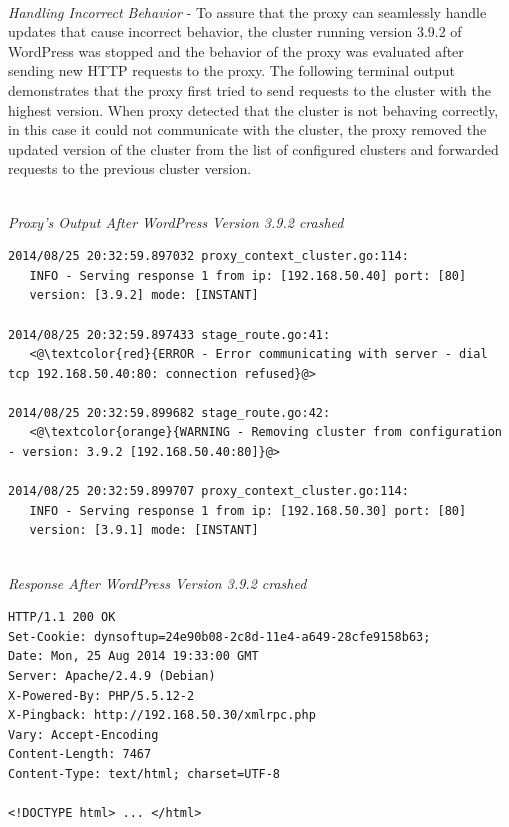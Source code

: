\documentclass[a4paper,11pt,twoside]{report}
\begin{document}
\noindent\\
\textit{Handling Incorrect Behavior} - To assure that the proxy can seamlessly handle updates that cause incorrect behavior, the cluster running version 3.9.2 of WordPress was stopped and the behavior of the proxy was evaluated after sending new HTTP requests to the proxy. The following terminal output demonstrates that the proxy first tried to send requests to the cluster with the highest version. When proxy detected that the cluster is not behaving correctly, in this case it could not communicate with the cluster, the proxy removed the updated version of the cluster from the list of configured clusters and forwarded requests to the previous cluster version. 

\noindent\\
\textit{Proxy's Output After WordPress Version 3.9.2 crashed}
\begin{lstlisting}[language=terminal]
2014/08/25 20:32:59.897032 proxy_context_cluster.go:114:     
   INFO - Serving response 1 from ip: [192.168.50.40] port: [80] 
   version: [3.9.2] mode: [INSTANT]
   
2014/08/25 20:32:59.897433 stage_route.go:41:    
   <@\textcolor{red}{ERROR - Error communicating with server - dial tcp 192.168.50.40:80: connection refused}@>

2014/08/25 20:32:59.899682 stage_route.go:42:  
   <@\textcolor{orange}{WARNING - Removing cluster from configuration - version: 3.9.2 [192.168.50.40:80]}@>

2014/08/25 20:32:59.899707 proxy_context_cluster.go:114:     
   INFO - Serving response 1 from ip: [192.168.50.30] port: [80] 
   version: [3.9.1] mode: [INSTANT]
\end{lstlisting}

\noindent\\
\textit{Response After WordPress Version 3.9.2 crashed}
\begin{lstlisting}[language=terminal]
HTTP/1.1 200 OK
Set-Cookie: dynsoftup=24e90b08-2c8d-11e4-a649-28cfe9158b63;
Date: Mon, 25 Aug 2014 19:33:00 GMT
Server: Apache/2.4.9 (Debian)
X-Powered-By: PHP/5.5.12-2
X-Pingback: http://192.168.50.30/xmlrpc.php
Vary: Accept-Encoding
Content-Length: 7467
Content-Type: text/html; charset=UTF-8

<!DOCTYPE html> ... </html>  
\end{lstlisting}
   
\end{document}
